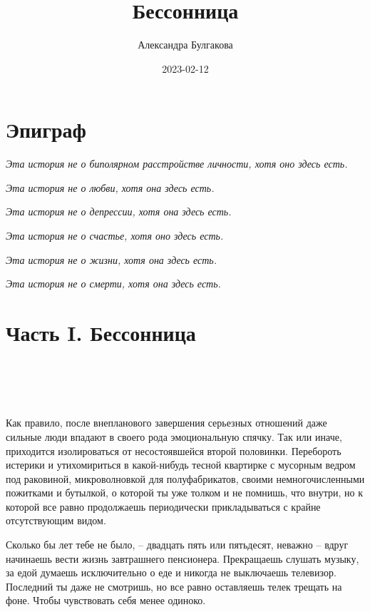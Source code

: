 \documentclass[
]{book}
\title{Бессонница}
\author{Александра Булгакова}
\date{2023-02-12}
\begin{document}
\maketitle

{
\setcounter{tocdepth}{1}
\tableofcontents
}
\hypertarget{ux44dux43fux438ux433ux440ux430ux444}{%
\chapter*{Эпиграф}\label{ux44dux43fux438ux433ux440ux430ux444}}

\emph{Эта история не о биполярном расстройстве личности, хотя оно здесь есть.}

\emph{Эта история не о любви, хотя она здесь есть.}

\emph{Эта история не о депрессии, хотя она здесь есть.}

\emph{Эта история не о счастье, хотя оно здесь есть.}

\emph{Эта история не о жизни, хотя она здесь есть.}

\emph{Эта история не о смерти, хотя она здесь есть.}

\hypertarget{ux447ux430ux441ux442ux44c-i.-ux431ux435ux441ux441ux43eux43dux43dux438ux446ux430}{%
\chapter*{Часть I. Бессонница}\label{ux447ux430ux441ux442ux44c-i.-ux431ux435ux441ux441ux43eux43dux43dux438ux446ux430}}

\hypertarget{chapter-1}{%
\chapter{~}\label{chapter-1}}

Как правило, после внепланового завершения серьезных отношений даже сильные люди впадают в своего рода эмоциональную спячку. Так или иначе, приходится изолироваться от несостоявшейся второй половинки. Перебороть истерики и утихомириться в какой-нибудь тесной квартирке с мусорным ведром под раковиной, микроволновкой для полуфабрикатов, своими немногочисленными пожитками и бутылкой, о которой ты уже толком и не помнишь, что внутри, но к которой все равно продолжаешь периодически прикладываться с крайне отсутствующим видом.

Сколько бы лет тебе не было, -- двадцать пять или пятьдесят, неважно -- вдруг начинаешь вести жизнь завтрашнего пенсионера. Прекращаешь слушать музыку, за едой думаешь исключительно о еде и никогда не выключаешь телевизор. Последний ты даже не смотришь, но все равно оставляешь телек трещать на фоне. Чтобы чувствовать себя менее одиноко.
\end{document}
